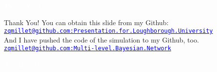 \begin{frame}{}
    \label{Section: Thank You}
    \centering
    \vfill\vspace{1em}\textcolor{white}{\scshape Thank You!}\vfill
\end{frame}


\begin{frame}{Thank You!}
    \label{Thank You: Thank You}
    You can obtain this slide from my Github:\\
    \href{https://github.com/zqmillet/Presentation.for.Loughborough.University}{\tt \small \textcolor{blue}{zqmillet@github.com:Presentation.for.Loughborough.University}}\\[15pt]

    \pause
    And I have pushed the code of the simulation to my Github, too.\\
    \href{https://github.com/zqmillet/Multi-level.Bayesian.Network}{\tt \small \textcolor{blue}{zqmillet@github.com:Multi-level.Bayesian.Network}}\\[15pt]

\end{frame}

\begin{frame}{}
    \label{Section: Questions}
    \centering
    \vfill\vspace{1em}\textcolor{white}{\scshape Any Questions?}\vfill
\end{frame}




